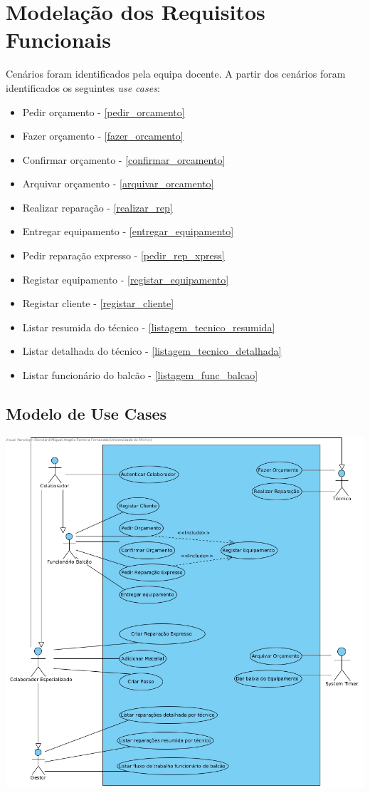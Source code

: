 \documentclass[a4paper,12pt]{scrreprt}
\begin{document}
\chapter{Modelação dos Requisitos Funcionais}
Cenários foram identificados pela equipa docente.
A partir dos cenários foram identificados os seguintes \textit{use cases}:
\begin{itemize}
        \item Pedir orçamento - \ref{pedir_orcamento}
        \item Fazer orçamento - \ref{fazer_orcamento}
        \item Confirmar orçamento - \ref{confirmar_orcamento}
        \item Arquivar orçamento - \ref{arquivar_orcamento}
        \item Realizar reparação - \ref{realizar_rep}
        \item Entregar equipamento - \ref{entregar_equipamento}
        \item Pedir reparação expresso - \ref{pedir_rep_xpress}
        \item Registar equipamento - \ref{registar_equipamento}
        \item Registar cliente - \ref{registar_cliente}
        \item Listar resumida do técnico - \ref{listagem_tecnico_resumida}
        \item Listar detalhada do técnico - \ref{listagem_tecnico_detalhada}
        \item Listar funcionário do balcão - \ref{listagem_func_balcao}
\end{itemize}
\section{Modelo de Use Cases} %

\includegraphics[scale=0.45]{dss-usecase.jpg}
\end{document}
